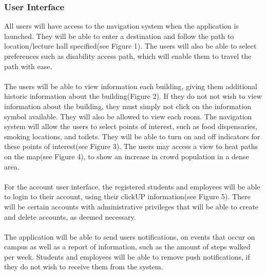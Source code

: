 \documentclass{article}
\begin{document}
            \subsubsection{User Interface}
	    {All users will have access to the navigation system when the application is launched.
They will be able to enter a destination and follow the path to location/lecture hall specified(see Figure 1).
The users will also be able to select preferences such as disability access path, which will enable them to travel the path with ease.\\\\
The users will be able to view information each building, giving them additional historic information about the building(Figure 2). If they do not not wish to 
view information about the building, they must simply not click on the information symbol available.
They will also be allowed to view each room. The navigation system will allow the users to select points of interest, such as food dispensaries, 
smoking locations, and toilets. They will be able to turn on and off indicators for these points of interest(see Figure 3).
The users may access a view to heat paths on the map(see Figure 4), to show an increase in crowd population in a dense area.\\\\
For the account user interface, the registered students and employees will be able to login to their account, using their clickUP information(see Figure 5).
There will be certain accounts with administrative privileges that will be able to create and delete accounts, as deemed necessary.\\\\
The application will be able to send users notifications, on events that occur on campus as well as a report of information, such as the amount of 
steps walked per week. Students and employees will be able to remove push notifications, if they do not wish to receive them from the system.

}
\end{document}
